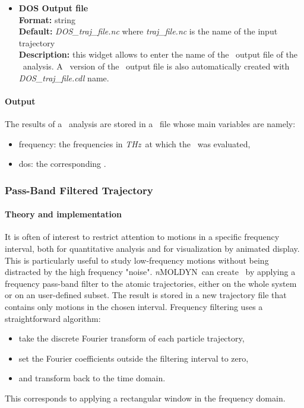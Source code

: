 \documentclass[a4paper,11pt]{report}
\newcommand{\thz}{\textit{THz}}
\newcommand{\NMOLDYN}{\textit{n}MOLDYN}
\begin{document}
\begin{itemize}
\item \textbf{DOS Output file}\\
\textbf{Format:} string\\
\textbf{Default:} \textit{DOS\_traj\_file.nc} where \textit{traj\_file.nc} is the name of the input trajectory\\
\textbf{Description:} this widget allows to enter the name of the \NetCDF\ output file of the \DOS\ analysis. A \CDL\ 
version of the \NetCDF\ output file is also automatically created with \textit{DOS\_traj\_file.cdl} name.
\end{itemize}

\paragraph{Output\\}
The results of a \DOS\ analysis are stored in a \NetCDF\ file whose main variables are namely:
\begin{itemize}
\item frequency: the frequencies in \thz\ at which the \DOS\ was evaluated,
\item dos: the corresponding \DOS .
\end{itemize}

\subsubsection{Pass-Band Filtered Trajectory}
\label{pbft}
\paragraph{Theory and implementation\\}
\label{pbft_theory}
It is often of interest to restrict attention to motions in a specific frequency interval, both for quantitative analysis 
and for visualization by animated display. This is particularly useful to study low-frequency motions without being 
distracted by the high frequency "noise". \NMOLDYN\ can create \PBFT\ by applying a frequency pass-band filter to the 
atomic trajectories, either on the whole system or on an user-defined subset. The result is stored in a new trajectory file that contains only motions in the 
chosen interval. Frequency filtering uses a straightforward algorithm:
\begin{itemize}
\item take the discrete Fourier transform of each particle trajectory,
\item set the Fourier coefficients outside the filtering interval to zero,
\item and transform back to the time domain.
\end{itemize} 
This corresponds to applying a rectangular window in the frequency domain.
\end{document}
